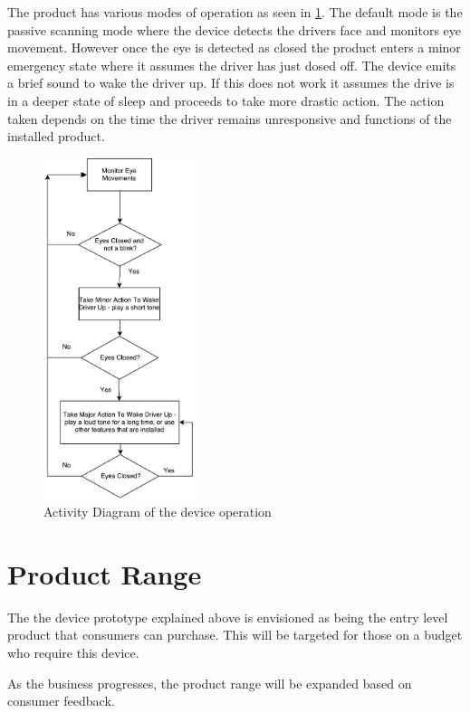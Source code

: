 The product has various modes of operation as seen in \cref{fig:DeviceFlowChart}. The default mode is the passive scanning mode where the device detects the drivers face and monitors eye movement. However once the eye is detected as closed the product  enters a minor emergency state where it assumes the driver has just dosed off. The device emits a brief sound to wake the driver up. If this does not work it assumes the drive is in a deeper state of sleep and proceeds to take more drastic action. The action taken depends on the time the driver remains unresponsive and functions of the installed product.

\begin{figure}[H]
\centering
\includegraphics[width=0.4\textwidth]{images/ProductFlowchart}
\vskip10pt
\caption[Device Operation Activity Diagram]{Activity Diagram of the device operation}
\label{fig:DeviceFlowChart}
\end{figure}



\section{Product Range}

The the device prototype explained above is envisioned as being the entry level product that consumers can purchase. This will be targeted for those on a budget who require this device.

As the business progresses, the product range will be expanded based on consumer feedback.

